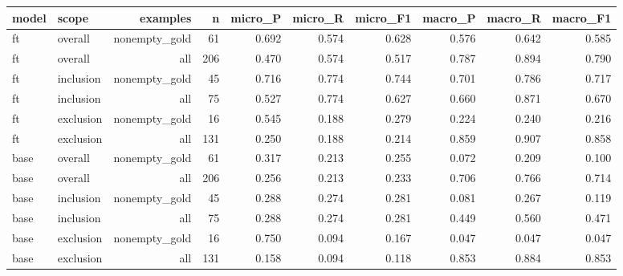 \begin{tabular}{llrrrrrrrr}
\toprule
model & scope & examples & n & micro\_P & micro\_R & micro\_F1 & macro\_P & macro\_R & macro\_F1 \\
\midrule
ft & overall & nonempty\_gold & 61 & 0.692 & 0.574 & 0.628 & 0.576 & 0.642 & 0.585 \\
ft & overall & all & 206 & 0.470 & 0.574 & 0.517 & 0.787 & 0.894 & 0.790 \\
ft & inclusion & nonempty\_gold & 45 & 0.716 & 0.774 & 0.744 & 0.701 & 0.786 & 0.717 \\
ft & inclusion & all & 75 & 0.527 & 0.774 & 0.627 & 0.660 & 0.871 & 0.670 \\
ft & exclusion & nonempty\_gold & 16 & 0.545 & 0.188 & 0.279 & 0.224 & 0.240 & 0.216 \\
ft & exclusion & all & 131 & 0.250 & 0.188 & 0.214 & 0.859 & 0.907 & 0.858 \\
base & overall & nonempty\_gold & 61 & 0.317 & 0.213 & 0.255 & 0.072 & 0.209 & 0.100 \\
base & overall & all & 206 & 0.256 & 0.213 & 0.233 & 0.706 & 0.766 & 0.714 \\
base & inclusion & nonempty\_gold & 45 & 0.288 & 0.274 & 0.281 & 0.081 & 0.267 & 0.119 \\
base & inclusion & all & 75 & 0.288 & 0.274 & 0.281 & 0.449 & 0.560 & 0.471 \\
base & exclusion & nonempty\_gold & 16 & 0.750 & 0.094 & 0.167 & 0.047 & 0.047 & 0.047 \\
base & exclusion & all & 131 & 0.158 & 0.094 & 0.118 & 0.853 & 0.884 & 0.853 \\
\bottomrule
\end{tabular}
